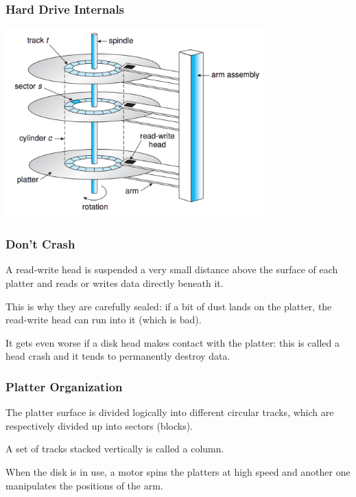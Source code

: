 \begin{frame}
\frametitle{Hard Drive Internals}

\begin{center}
	\includegraphics[width=0.75\textwidth]{images/disk-hardware.png}
\end{center}

\end{frame}

\begin{frame}
\frametitle{Don't Crash}

A read-write head is suspended a very small distance above the surface of each platter and reads or writes data directly beneath it. 

This is why they are carefully sealed: if a bit of dust lands on the platter, the read-write head can run into it (which is bad). 

It gets even worse if a disk head makes contact with the platter: this is called a head crash and it tends to permanently destroy data. 


\end{frame}

\begin{frame}
\frametitle{Platter Organization}

The platter surface is divided logically into different circular tracks, which are respectively divided up into sectors (blocks). 

A set of tracks stacked vertically is called a column. 

When the disk is in use, a motor spins the platters at high speed and another one manipulates the positions of the arm.


\end{frame}

